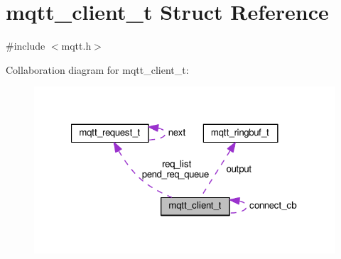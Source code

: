 \hypertarget{structmqtt__client__t}{}\section{mqtt\+\_\+client\+\_\+t Struct Reference}
\label{structmqtt__client__t}


{\ttfamily \#include $<$mqtt.\+h$>$}



Collaboration diagram for mqtt\+\_\+client\+\_\+t\+:
\nopagebreak
\begin{figure}[H]
\begin{center}
\leavevmode
\includegraphics[width=321pt]{structmqtt__client__t__coll__graph}
\end{center}
\end{figure}

